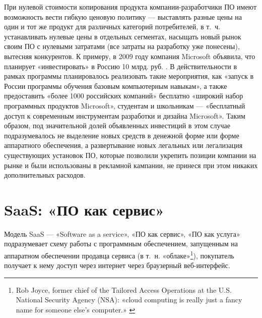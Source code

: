 \documentclass{article}
\begin{document}
При нулевой стоимости копирования продукта компании-разработчики ПО имеют возможность вести гибкую ценовую политику — выставлять разные цены на один и тот же продукт для различных категорий потребителей, в т.~ч. устанавливать нулевые цены в отдельных сегментах, насыщать новый рынок своим ПО с нулевыми затратами (все затраты на разработку уже понесены), вытесняя конкурентов. К примеру, в 2009 году компания Microsoft объявила, что планирует «инвестировать» в Россию 10 млрд. руб. \cite{microsoftInvestsRF}. В действительности в рамках программы планировалось реализовать такие мероприятия, как «запуск в России программы обучения базовым компьютерным навыкам», а также предоставить «более 1000 российских компаний» бесплатно «широкий набор программных продуктов Microsoft», студентам и школьникам — «бесплатный доступ к современным инструментам разработки и дизайна Microsoft». Таким образом, под значительной долей объявленных инвестиций в этом случае подразумевалось не выделение новых средств в денежной форме или форме аппаратного обеспечения, а развертывание новых легальных или легализация существующих установок ПО, которые позволили укрепить позиции компании на рынке и были использованы в рекламной кампании, не принеся при этом никаких дополнительных расходов.

\section*{SaaS: «ПО как сервис»}

Модель SaaS — «Software as a service», «ПО как сервис», «ПО как услуга» подразумевает схему работы с программным обеспечением, запущенным на аппаратном обеспечении продавца сервиса (в т.~н. «облаке»\footnote{Rob Joyce, former chief of the Tailored Access Operations at the U.S. National Security Agency (NSA): «cloud computing is really just a fancy name for someone else’s computer.» \cite{cloudIsAFancyName}}), покупатель получает к нему доступ через интернет через браузерный веб-интерфейс.
\end{document}
